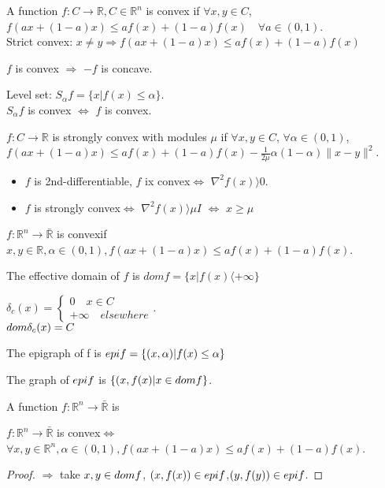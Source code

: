 \documentclass[11pt]{book} %
\def\R{\mathbb{R}}
\newcommand{\cvx}{convex}
\begin{document}
\begin{definition}
A function $f : C \rightarrow \R, C \in \R^n$ is convex if $\forall x, y \in C$, $f(ax + (1-a)x) \le af(x) + (1-a)f(x) \quad \forall a \in (0,1)$.\\ 
Strict convex: $x \neq y \Rightarrow f(ax + (1-a)x) \le af(x) + (1-a)f(x) $
\end{definition}
\begin{remark}
$f$ is convex $\Rightarrow$ $-f$ is concave.
\end{remark}
Level set: $S_{\alpha}f = \{ x | f(x) \le \alpha \}$.\\ 
$S_{\alpha}f$ is convex $\Leftrightarrow$ $f$ is convex. \\
\begin{definition}
$f : C \rightarrow \R$ is strongly convex with modules $\mu$ if $\forall x, y \in C$, $\forall \alpha \in (0,1)$, $f(ax + (1-a)x) \le af(x) + (1-a)f(x) - \frac{1}{2\mu}\alpha(1- \alpha) \|x-y\|^2$.
\end{definition}

\begin{remark}
\begin{itemize}
\item $f$ is 2nd-differentiable, $f$ ix \cvx $\iff$ $\nabla^2f(x) \rangle  0$.
\item $f$ is strongly \cvx $\iff$ $\nabla^2f(x) \rangle  \mu I$ $\iff$ $x \ge \mu$
\end{itemize}
\end{remark}
\begin{definition}[2]
$f : \R^n \to \bar{\R} $ is \cvx  if $x, y  \in \R , \alpha \in (0,1), f(ax + (1-a)x) \le af(x) + (1-a)f(x)$.  
\end{definition}
The effective domain of $f$ is $dom f = \{x | f(x) \langle + \infty \}$ 
\begin{example}
$\delta_c(x) = \begin{cases}
0 \quad  x \in C \\
+ \infty \quad elsewhere
\end{cases}$.\\
$dom \space \delta_c(x) = C$
\end{example}
\begin{definition}[Epigraph]
The epigraph of f is $epi \space f = \{(x,\alpha) | f(x) \le \alpha\}$
\end{definition}
The graph of $epi \space f$ is $\{ (x,f(x) | x \in dom \space f\}$.
\begin{definition}[III]
A function $f : \R^n \to \bar{\R}$ is %
\end{definition}
\begin{theorem}
$f : \R^n \to \bar{\R}$ is \cvx  $\iff$ $\forall x,y \in \R^n, \alpha \in (0,1), f(ax + (1-a)x) \le af(x) + (1-a)f(x)$.
\end{theorem}
\begin{proof}
$\Rightarrow$ take $x,y \in dom \space f$, $(x,f(x)) \in epi \space f$,$(y,f(y)) \in epi \space f$.
\end{proof}
\end{document}
